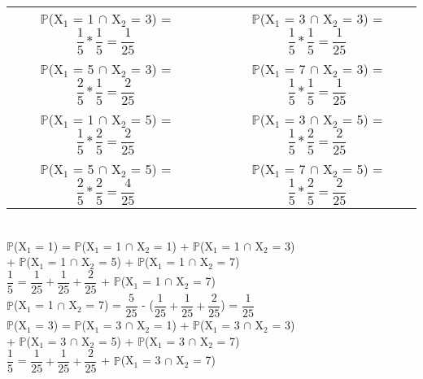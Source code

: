\documentclass[12pt,a4paper,draft,final,oneside]{article}
\begin{document}
\begin{center}
\begin{tabular}{ccc}
			$\mathbb{P}$(X$_{1}$ = 1 $\cap$ X$_{2}$ = 3) = $\dfrac{1}{5}*\dfrac{1}{5} = \dfrac{1}{25}$ & & $\mathbb{P}$(X$_{1}$ = 3 $\cap$ X$_{2}$ = 3) = $\dfrac{1}{5}*\dfrac{1}{5} = \dfrac{1}{25}$
			\vspace{0.5cm}\\
			$\mathbb{P}$(X$_{1}$ = 5 $\cap$ X$_{2}$ = 3) = $\dfrac{2}{5}*\dfrac{1}{5} = \dfrac{2}{25}$ & &
			$\mathbb{P}$(X$_{1}$ = 7 $\cap$ X$_{2}$ = 3) = $\dfrac{1}{5}*\dfrac{1}{5} = \dfrac{1}{25}$ \vspace{0.5cm}\\
			$\mathbb{P}$(X$_{1}$ = 1 $\cap$ X$_{2}$ = 5) = $\dfrac{1}{5}*\dfrac{2}{5} = \dfrac{2}{25}$ & & $\mathbb{P}$(X$_{1}$ = 3 $\cap$ X$_{2}$ = 5) = $\dfrac{1}{5}*\dfrac{2}{5} = \dfrac{2}{25}$
			\vspace{0.5cm}\\
			$\mathbb{P}$(X$_{1}$ = 5 $\cap$ X$_{2}$ = 5) = $\dfrac{2}{5}*\dfrac{2}{5} = \dfrac{4}{25}$ & &
			$\mathbb{P}$(X$_{1}$ = 7 $\cap$ X$_{2}$ = 5) = $\dfrac{1}{5}*\dfrac{2}{5} = \dfrac{2}{25}$ \vspace{0.5cm}\\	
		\end{tabular}
		\vspace{1cm}\\
		$\mathbb{P}$(X$_{1}$ = 1) = $\mathbb{P}$(X$_{1}$ = 1 $\cap$ X$_{2}$ = 1) + $\mathbb{P}$(X$_{1}$ = 1 $\cap$ X$_{2}$ = 3)\\
		+ $\mathbb{P}$(X$_{1}$ = 1 $\cap$ X$_{2}$ = 5) + $\mathbb{P}$(X$_{1}$ = 1 $\cap$ X$_{2}$ = 7)
		\vspace{0.25cm}\\
		$\dfrac{1}{5}$ = $\dfrac{1}{25} + \dfrac{1}{25} + \dfrac{2}{25}$ + $\mathbb{P}$(X$_{1}$ = 1 $\cap$ X$_{2}$ = 7)
		\vspace{0.25cm}\\
		$\mathbb{P}$(X$_{1}$ = 1 $\cap$ X$_{2}$ = 7) = $\dfrac{5}{25}$ - ($\dfrac{1}{25} + \dfrac{1}{25} + \dfrac{2}{25}$) = $\dfrac{1}{25}$
		\vspace{1cm}\\
		$\mathbb{P}$(X$_{1}$ = 3) = $\mathbb{P}$(X$_{1}$ = 3 $\cap$ X$_{2}$ = 1) + $\mathbb{P}$(X$_{1}$ = 3 $\cap$ X$_{2}$ = 3)\\
		+ $\mathbb{P}$(X$_{1}$ = 3 $\cap$ X$_{2}$ = 5) + $\mathbb{P}$(X$_{1}$ = 3 $\cap$ X$_{2}$ = 7)
		\vspace{0.25cm}\\
		$\dfrac{1}{5}$ = $\dfrac{1}{25} + \dfrac{1}{25} + \dfrac{2}{25}$ + $\mathbb{P}$(X$_{1}$ = 3 $\cap$ X$_{2}$ = 7)
		\vspace{0.25cm}\\

\end{center}
\end{document}
